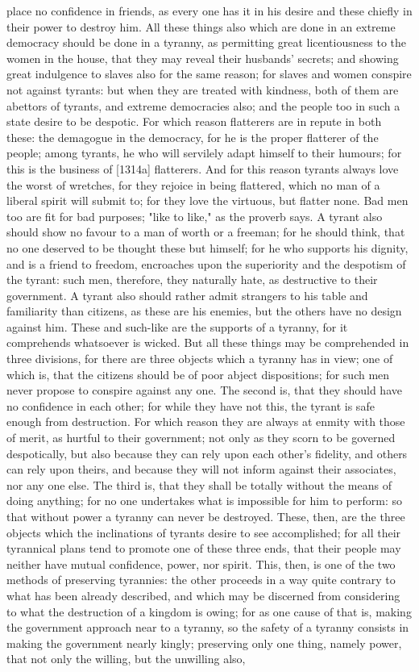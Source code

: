 \documentclass[12pt]{article}
\begin{document}
place no confidence in friends, as every one has it in his desire and these chiefly in their power to destroy him. All these things also which are done in an extreme democracy should be done in a tyranny, as permitting great licentiousness to the women in the house, that they may reveal their husbands' secrets; and showing great indulgence to slaves also for the same reason; for slaves and women conspire not against tyrants: but when they are treated with kindness, both of them are abettors of tyrants, and extreme democracies also; and the people too in such a state desire to be despotic. For which reason flatterers are in repute in both these: the demagogue in the democracy, for he is the proper flatterer of the people; among tyrants, he who will servilely adapt himself to their humours; for this is the business of [1314a] flatterers. And for this reason tyrants always love the worst of wretches, for they rejoice in being flattered, which no man of a liberal spirit will submit to; for they love the virtuous, but flatter none. Bad men too are fit for bad purposes; "like to like," as the proverb says. A tyrant also should show no favour to a man of worth or a freeman; for he should think, that no one deserved to be thought these but himself; for he who supports his dignity, and is a friend to freedom, encroaches upon the superiority and the despotism of the tyrant: such men, therefore, they naturally hate, as destructive to their government. A tyrant also should rather admit strangers to his table and familiarity than citizens, as these are his enemies, but the others have no design against him. These and such-like are the supports of a tyranny, for it comprehends whatsoever is wicked. But all these things may be comprehended in three divisions, for there are three objects which a tyranny has in view; one of which is, that the citizens should be of poor abject dispositions; for such men never propose to conspire against any one. The second is, that they should have no confidence in each other; for while they have not this, the tyrant is safe enough from destruction. For which reason they are always at enmity with those of merit, as hurtful to their government; not only as they scorn to be governed despotically, but also because they can rely upon each other's fidelity, and others can rely upon theirs, and because they will not inform against their associates, nor any one else. The third is, that they shall be totally without the means of doing anything; for no one undertakes what is impossible for him to perform: so that without power a tyranny can never be destroyed. These, then, are the three objects which the inclinations of tyrants desire to see accomplished; for all their tyrannical plans tend to promote one of these three ends, that their people may neither have mutual confidence, power, nor spirit. This, then, is one of the two methods of preserving tyrannies: the other proceeds in a way quite contrary to what has been already described, and which may be discerned from considering to what the destruction of a kingdom is owing; for as one cause of that is, making the government approach near to a tyranny, so the safety of a tyranny consists in making the government nearly kingly; preserving only one thing, namely power, that not only the willing, but the unwilling also, 
\end{document}
